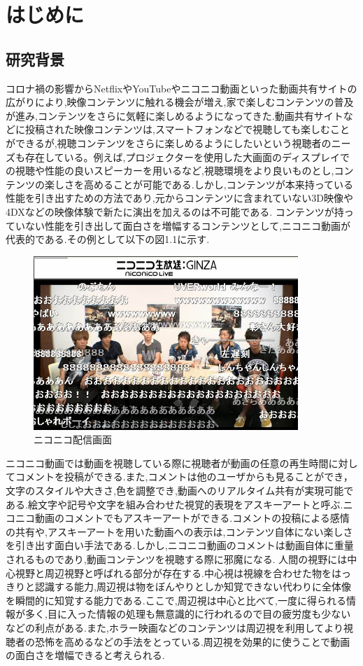 \chapter{はじめに}
\thispagestyle{myheadings}

\section{研究背景}
コロナ禍の影響からNetflixやYouTubeやニコニコ動画といった動画共有サイトの広がりにより,映像コンテンツに触れる機会が増え,家で楽しむコンテンツの普及が進み,コンテンツをさらに気軽に楽しめるようになってきた.動画共有サイトなどに投稿された映像コンテンツは,スマートフォンなどで視聴しても楽しむことができるが,視聴コンテンツをさらに楽しめるようにしたいという視聴者のニーズも存在している。例えば,プロジェクターを使用した大画面のディスプレイでの視聴や性能の良いスピーカーを用いるなど,視聴環境をより良いものとし,コンテンツの楽しさを高めることが可能である.しかし,コンテンツが本来持っている性能を引き出すための方法であり,元からコンテンツに含まれていない3D映像や4DXなどの映像体験で新たに演出を加えるのは不可能である.
コンテンツが持っていない性能を引き出して面白さを増幅するコンテンツとして,ニコニコ動画が代表的である.その例として以下の図1.1に示す.
\begin{figure}[H]
    \centering
    \includegraphics[width=10cm]{images/chapter1/nikoniko.jpeg}
    \caption{ニコニコ配信画面}
    \label{abst}
\end{figure}
ニコニコ動画では動画を視聴している際に視聴者が動画の任意の再生時間に対してコメントを投稿ができる.また,コメントは他のユーザからも見ることができ，文字のスタイルや大きさ,色を調整でき,動画へのリアルタイム共有が実現可能である.絵文字や記号や文字を組み合わせた視覚的表現をアスキーアートと呼ぶ.ニコニコ動画のコメントでもアスキーアートができる.コメントの投稿による感情の共有や,アスキーアートを用いた動画への表示は,コンテンツ自体にない楽しさを引き出す面白い手法である.しかし,ニコニコ動画のコメントは動画自体に重量されるものであり,動画コンテンツを視聴する際に邪魔になる.
人間の視野には中心視野と周辺視野と呼ばれる部分が存在する.中心視は視線を合わせた物をはっきりと認識する能力,周辺視は物をぼんやりとしか知覚できない代わりに全体像を瞬間的に知覚する能力である.ここで,周辺視は中心と比べて,一度に得られる情報が多く,目に入った情報の処理も無意識的に行われるので目の疲労度も少ないなどの利点がある.また,ホラー映画などのコンテンツは周辺視を利用してより視聴者の恐怖を高めるなどの手法をとっている.周辺視を効果的に使うことで動画の面白さを増幅できると考えられる.



